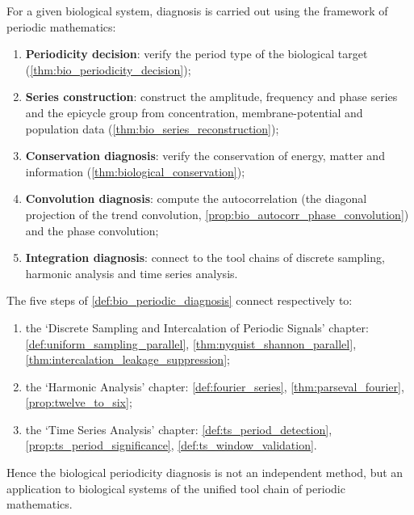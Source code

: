 \begin{definition}\label{def:bio_periodic_diagnosis}
For a given biological system, diagnosis is carried out using the framework of periodic mathematics:
\begin{enumerate}[label=(\roman*)]
    \item \textbf{Periodicity decision}: verify the period type of the biological target (\cref{thm:bio_periodicity_decision});
    \item \textbf{Series construction}: construct the amplitude, frequency and phase series and the epicycle group from concentration, membrane-potential and population data (\cref{thm:bio_series_reconstruction});
    \item \textbf{Conservation diagnosis}: verify the conservation of energy, matter and information (\cref{thm:biological_conservation});
    \item \textbf{Convolution diagnosis}: compute the autocorrelation (the diagonal projection of the trend convolution, \cref{prop:bio_autocorr_phase_convolution}) and the phase convolution;
    \item \textbf{Integration diagnosis}: connect to the tool chains of discrete sampling, harmonic analysis and time series analysis.
\end{enumerate}
\end{definition}

\begin{theorem}\label{thm:bio_diagnosis_integration}
The five steps of \cref{def:bio_periodic_diagnosis} connect respectively to:
\begin{enumerate}[label=(\roman*)]
    \item the `Discrete Sampling and Intercalation of Periodic Signals' chapter: \cref{def:uniform_sampling_parallel}, \cref{thm:nyquist_shannon_parallel}, \cref{thm:intercalation_leakage_suppression};
    \item the `Harmonic Analysis' chapter: \cref{def:fourier_series}, \cref{thm:parseval_fourier}, \cref{prop:twelve_to_six};
    \item the `Time Series Analysis' chapter: \cref{def:ts_period_detection}, \cref{prop:ts_period_significance}, \cref{def:ts_window_validation}.
\end{enumerate}
Hence the biological periodicity diagnosis is not an independent method, but an application to biological systems of the unified tool chain of periodic mathematics.
\end{theorem}

